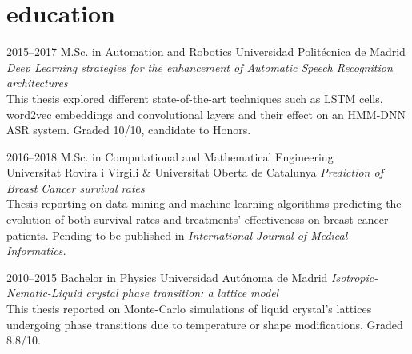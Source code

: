 \documentclass[]{friggeri-cv-a4}
\begin{document}

\section{education}

\begin{entrylist}


\entry
{2015--2017}
{M.Sc. {\normalfont in Automation and Robotics}}
{Universidad Politécnica de Madrid}
{\small{\emph{Deep Learning strategies for the enhancement of Automatic Speech Recognition architectures} }\\ This thesis explored different state-of-the-art techniques such as LSTM cells, word2vec embeddings and convolutional layers and their effect on an HMM-DNN ASR system. Graded 10/10, candidate to Honors.}


\entry
{2016--2018}
{M.Sc. {\normalfont in Computational and Mathematical Engineering}}
{\\Universitat Rovira i Virgili \& Universitat Oberta de Catalunya}
{\small{\emph{Prediction of Breast Cancer survival rates}} \\ Thesis reporting on data mining and machine learning algorithms predicting the evolution of both survival rates and treatments' effectiveness on breast cancer patients. Pending to be published in \emph{International Journal of Medical Informatics. }}


\entry
{2010--2015}
{Bachelor {\normalfont in Physics}}
{Universidad Autónoma de Madrid}
{\small{\emph{Isotropic-Nematic-Liquid crystal phase transition: a lattice model}} \\ This thesis reported on Monte-Carlo simulations of liquid crystal's lattices undergoing phase transitions due to temperature or shape modifications. Graded 8.8/10.}


\end{entrylist}

\end{document}
